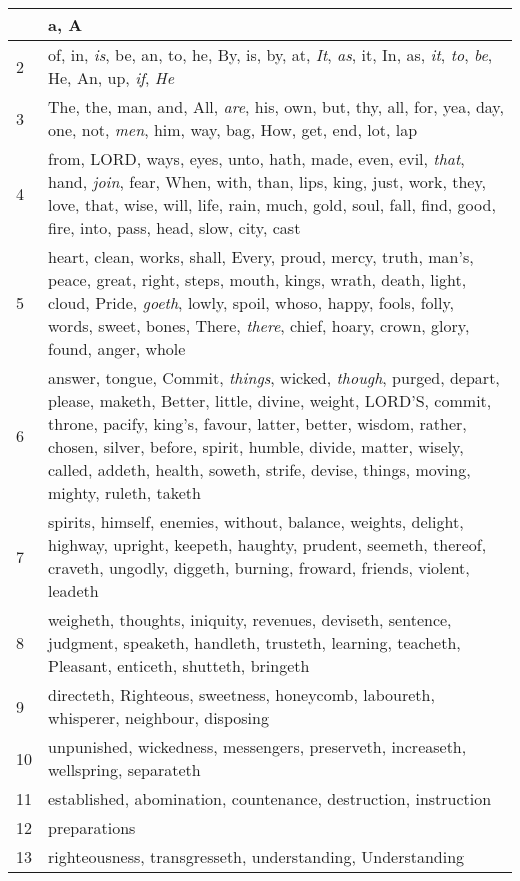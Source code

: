 \begin{center}
\begin{longtable}{l|p{3.75in}}
\hline \hline 
\endlastfoot 
1 & a, A\\ \hline 
2 & of, in, \emph{is}, be, an, to, he, By, is, by, at, \emph{It}, \emph{as}, it, In, as, \emph{it}, \emph{to}, \emph{be}, He, An, up, \emph{if}, \emph{He}\\ \hline 
3 & The, the, man, and, All, \emph{are}, his, own, but, thy, all, for, yea, day, one, not, \emph{men}, him, way, bag, How, get, end, lot, lap\\ \hline 
4 & from, LORD, ways, eyes, unto, hath, made, even, evil, \emph{that}, hand, \emph{join}, fear, When, with, than, lips, king, just, work, they, love, that, wise, will, life, rain, much, gold, soul, fall, find, good, fire, into, pass, head, slow, city, cast\\ \hline 
5 & heart, clean, works, shall, Every, proud, mercy, truth, man's, peace, great, right, steps, mouth, kings, wrath, death, light, cloud, Pride, \emph{goeth}, lowly, spoil, whoso, happy, fools, folly, words, sweet, bones, There, \emph{there}, chief, hoary, crown, glory, found, anger, whole\\ \hline 
6 & answer, tongue, Commit, \emph{things}, wicked, \emph{though}, purged, depart, please, maketh, Better, little, divine, weight, LORD'S, commit, throne, pacify, king's, favour, latter, better, wisdom, rather, chosen, silver, before, spirit, humble, divide, matter, wisely, called, addeth, health, soweth, strife, devise, things, moving, mighty, ruleth, taketh\\ \hline 
7 & spirits, himself, enemies, without, balance, weights, delight, highway, upright, keepeth, haughty, prudent, seemeth, thereof, craveth, ungodly, diggeth, burning, froward, friends, violent, leadeth\\ \hline 
8 & weigheth, thoughts, iniquity, revenues, deviseth, sentence, judgment, speaketh, handleth, trusteth, learning, teacheth, Pleasant, enticeth, shutteth, bringeth\\ \hline 
9 & directeth, Righteous, sweetness, honeycomb, laboureth, whisperer, neighbour, disposing\\ \hline 
10 & unpunished, wickedness, messengers, preserveth, increaseth, wellspring, separateth\\ \hline 
11 & established, abomination, countenance, destruction, instruction\\ \hline 
12 & preparations\\ \hline 
13 & righteousness, transgresseth, understanding, Understanding\\ \hline 
\end{longtable} 
\end{center} 




 
